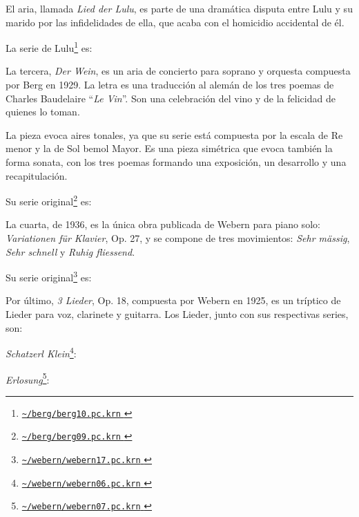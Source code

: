 	El aria, llamada \textit{Lied der Lulu}, es parte de una dramática disputa entre Lulu y su marido por las infidelidades de ella, que acaba con el homicidio accidental de él.
	
	{La serie de Lulu\footnote{\href{http://www.ccarh.org/publications/data/humdrum/tonerow/files/berg/berg10.pc.krn}{ \texttt{\textasciitilde/berg/berg10.pc.krn} }} es:
		}
	
	La tercera, \textit{Der Wein}, es un aria de concierto para soprano y orquesta compuesta por Berg en 1929. La letra es una traducción al alemán de los tres poemas de Charles Baudelaire ``\textit{Le Vin}''. Son una celebración del vino y de la felicidad de quienes lo toman.
	
	La pieza evoca aires tonales, ya que su serie está compuesta por la escala de Re menor y la de Sol bemol Mayor. Es una pieza simétrica que evoca también la forma sonata, con los tres poemas formando una exposición, un desarrollo y una recapitulación.
	
	{Su serie original\footnote{\href{http://www.ccarh.org/publications/data/humdrum/tonerow/files/berg/berg09.pc.krn}{ \texttt{\textasciitilde/berg/berg09.pc.krn} }} es:        	
		}
	
	La cuarta, de 1936, es la única obra publicada de Webern para piano solo: \textit{Variationen für Klavier}, Op. 27, y se compone de tres movimientos: \textit{Sehr mässig}, \textit{Sehr schnell} y \textit{Ruhig fliessend}.
	
	{Su serie original\footnote{\href{http://www.ccarh.org/publications/data/humdrum/tonerow/files/webern/webern17.pc.krn}{ \texttt{\textasciitilde/webern/webern17.pc.krn} }} es:
		}
	
	Por último, \textit{3 Lieder}, Op. 18, compuesta por Webern en 1925, es un tríptico de Lieder para voz, clarinete y guitarra. Los Lieder, junto con sus respectivas series, son:
	
	\textit{Schatzerl Klein}\footnote{\href{http://www.ccarh.org/publications/data/humdrum/tonerow/files/webern/webern06.pc.krn}{ \texttt{\textasciitilde/webern/webern06.pc.krn} }}: \hfill
	
	\textit{Erlosung}\footnote{\href{http://www.ccarh.org/publications/data/humdrum/tonerow/files/webern/webern07.pc.krn}{ \texttt{\textasciitilde/webern/webern07.pc.krn} }}: \hfill
	
